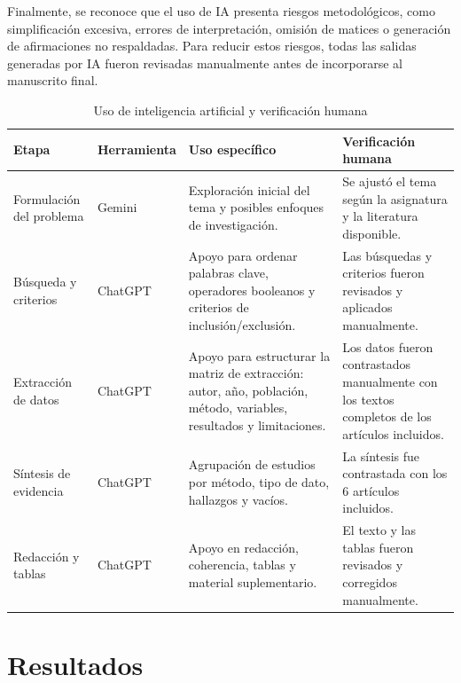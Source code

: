 \documentclass[12pt,a4paper]{article}
\renewcommand{\arraystretch}{1.12}
\begin{document}
Finalmente, se reconoce que el uso de IA presenta riesgos metodológicos, como simplificación excesiva, errores de interpretación, omisión de matices o generación de afirmaciones no respaldadas. Para reducir estos riesgos, todas las salidas generadas por IA fueron revisadas manualmente antes de incorporarse al manuscrito final.

\begin{table}[htbp]
\centering
\caption{Uso de inteligencia artificial y verificación humana}
\label{tab:uso_ia}
\renewcommand{\arraystretch}{1.15}
\small
\begin{tabularx}{\textwidth}{|
>{\raggedright\arraybackslash}p{2.6cm}|
>{\raggedright\arraybackslash}p{2.3cm}|
>{\raggedright\arraybackslash}X|
>{\raggedright\arraybackslash}X|}
\hline
\textbf{Etapa} & \textbf{Herramienta} & \textbf{Uso específico} & \textbf{Verificación humana} \\
\hline

Formulación del problema &
Gemini &
Exploración inicial del tema y posibles enfoques de investigación. &
Se ajustó el tema según la asignatura y la literatura disponible. \\
\hline

Búsqueda y criterios &
ChatGPT &
Apoyo para ordenar palabras clave, operadores booleanos y criterios de inclusión/exclusión. &
Las búsquedas y criterios fueron revisados y aplicados manualmente. \\
\hline

Extracción de datos &
ChatGPT &
Apoyo para estructurar la matriz de extracción: autor, año, población, método, variables, resultados y limitaciones. &
Los datos fueron contrastados manualmente con los textos completos de los artículos incluidos. \\
\hline

Síntesis de evidencia &
ChatGPT &
Agrupación de estudios por método, tipo de dato, hallazgos y vacíos. &
La síntesis fue contrastada con los 6 artículos incluidos. \\
\hline

Redacción y tablas &
ChatGPT &
Apoyo en redacción, coherencia, tablas y material suplementario. &
El texto y las tablas fueron revisados y corregidos manualmente. \\
\hline

\end{tabularx}
\end{table}

\section{Resultados}
\end{document}
